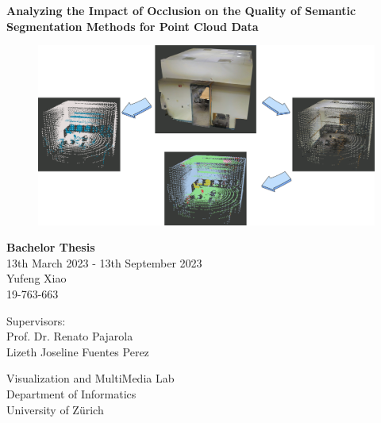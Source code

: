 \documentclass[11pt, a4paper,oneside,chapterprefix=false]{scrbook}
\begin{document}
\frontmatter
\begin{titlepage}
	\setlength{\parindent}{0cm}
	\addtolength{\textheight}{1.0cm}

	\vspace{0.2cm}
	\Huge
	\begin{center}
		{\textsf{\textbf{Analyzing the Impact of Occlusion on the Quality of Semantic Segmentation Methods for Point Cloud Data}}}	
	\end{center}
	

	\vfill \vfill \vfill
	\begin{figure}[h]
		\centering
		\includegraphics*[width=1.0\textwidth]{figures/cover.png}
	\end{figure}

	\vfill
	\sffamily\Large
	\begin{center}
		{\textbf{Bachelor Thesis}} \\ 
		13th March 2023 - 13th September 2023 \\[0.5cm]
		\large
		Yufeng Xiao \\ 19-763-663
	\end{center}

	\vfill \vfill \vfill
	\begin{minipage}[b]{0.5\textwidth} \raggedright
	Supervisors: \\
	Prof. Dr. Renato Pajarola \\
	Lizeth Joseline Fuentes Perez \\
	\end{minipage}
	\begin{minipage}[b]{0.5\textwidth} \raggedleft
	Visualization and MultiMedia Lab \\
	Department of Informatics \\
	University of Z{\"u}rich
	\end{minipage}


\end{titlepage}
\end{document}
